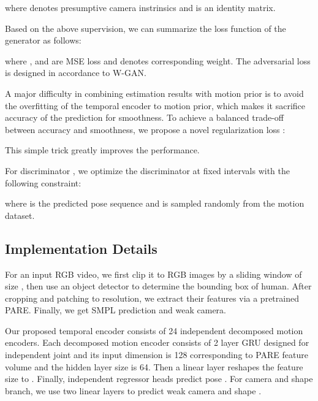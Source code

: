 \documentclass{svproc}
\begin{document}
where  denotes presumptive camera instrinsics and  is an identity matrix.

Based on the above supervision, we can summarize the loss function of the generator  as follows:

where ,  and  are MSE loss and  denotes corresponding weight. The adversarial loss is designed in accordance to W-GAN\cite{arjovsky2017wasserstein}.




A major difficulty in combining estimation results with motion prior is to avoid the overfitting of the temporal encoder to motion prior, which makes it sacrifice accuracy of the prediction for smoothness. To achieve a balanced trade-off between accuracy and smoothness, we propose a novel regularization loss :

This simple trick greatly improves the performance.

For discriminator , we optimize the discriminator at fixed intervals with the following constraint:

where  is the predicted pose sequence and  is sampled randomly from the motion dataset.

\subsection{Implementation Details}

For an input RGB video, we first clip it to RGB images by a sliding window of size , then use an object detector \cite{redmon2018yolov3} to determine the bounding box of human. After cropping and patching to  resolution, we extract their features via a pretrained PARE. Finally, we get SMPL prediction and weak camera.


Our proposed temporal encoder consists of 24 independent decomposed motion encoders. Each decomposed motion encoder consists of 2 layer GRU designed for independent joint and its input dimension is 128 corresponding to PARE feature volume and the hidden layer size is 64. Then a linear layer reshapes the feature size to . Finally, independent regressor heads predict pose . For camera and shape branch, we use two linear layers to predict weak camera  and shape .
\end{document}
